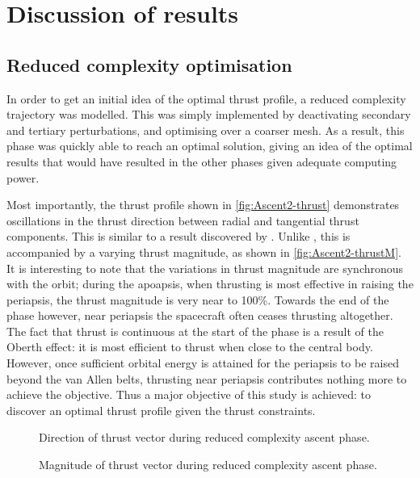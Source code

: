 \chapter{Discussion of results} \label{cha:Results}

\section{Reduced complexity optimisation} \label{sec:Reduced-complexity}

In order to get an initial idea of the optimal thrust profile, a reduced complexity trajectory was modelled. This was simply implemented by deactivating secondary and tertiary perturbations, and optimising over a coarser mesh. As a result, this phase was quickly able to reach an optimal solution, giving an idea of the optimal results that would have resulted in the other phases given adequate computing power.

Most importantly, the thrust profile shown in \autoref{fig:Ascent2-thrust} demonstrates oscillations in the thrust direction between radial and tangential thrust components. This is similar to a result discovered by \textcite{Betts2003}. Unlike \textcite{Betts2003}, this is accompanied by a varying thrust magnitude, as shown in \autoref{fig:Ascent2-thrustM}. It is interesting to note that the variations in thrust magnitude are synchronous with the orbit; during the apoapsis, when thrusting is most effective in raising the periapsis, the thrust magnitude is very near to 100\%. Towards the end of the phase however, near periapsis the spacecraft often ceases thrusting altogether. The fact that thrust is continuous at the start of the phase is a result of the Oberth effect: it is most efficient to thrust when close to the central body. However, once sufficient orbital energy is attained for the periapsis to be raised beyond the van Allen belts, thrusting near periapsis contributes nothing more to achieve the objective. Thus a major objective of this study is achieved: to discover an optimal thrust profile given the thrust constraints.

\begin{figure}
\caption{Direction of thrust vector during reduced complexity ascent phase.} \label{fig:Ascent2-thrust}
\centering
\def\svgwidth{\figurewidth}

\end{figure}

\begin{figure}
\caption{Magnitude of thrust vector during reduced complexity ascent phase.} \label{fig:Ascent2-thrustM}
\centering
\def\svgwidth{\figurewidth}

\end{figure}

